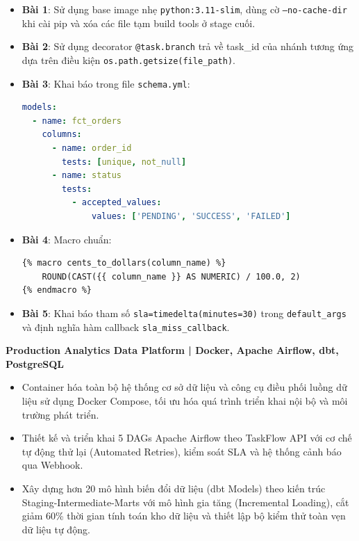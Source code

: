 \begin{dapanbox}
\begin{itemize}
    \item \textbf{Bài 1}: Sử dụng base image nhẹ \texttt{python:3.11-slim}, dùng cờ \texttt{--no-cache-dir} khi cài pip và xóa các file tạm build tools ở stage cuối.
    \item \textbf{Bài 2}: Sử dụng decorator \texttt{@task.branch} trả về task\_id của nhánh tương ứng dựa trên điều kiện \texttt{os.path.getsize(file\_path)}.
    \item \textbf{Bài 3}: Khai báo trong file \texttt{schema.yml}:
    \begin{lstlisting}[language=yaml]
models:
  - name: fct_orders
    columns:
      - name: order_id
        tests: [unique, not_null]
      - name: status
        tests:
          - accepted_values:
              values: ['PENDING', 'SUCCESS', 'FAILED']
    \end{lstlisting}
    \item \textbf{Bài 4}: Macro chuẩn:
    \begin{lstlisting}
{% macro cents_to_dollars(column_name) %}
    ROUND(CAST({{ column_name }} AS NUMERIC) / 100.0, 2)
{% endmacro %}
    \end{lstlisting}
    \item \textbf{Bài 5}: Khai báo tham số \texttt{sla=timedelta(minutes=30)} trong \texttt{default\_args} và định nghĩa hàm callback \texttt{sla\_miss\_callback}.
\end{itemize}
\end{dapanbox}

\begin{cvtipbox}
\textbf{Production Analytics Data Platform | Docker, Apache Airflow, dbt, PostgreSQL}
\begin{itemize}
    \item Container hóa toàn bộ hệ thống cơ sở dữ liệu và công cụ điều phối luồng dữ liệu sử dụng Docker Compose, tối ưu hóa quá trình triển khai nội bộ và môi trường phát triển.
    \item Thiết kế và triển khai 5 DAGs Apache Airflow theo TaskFlow API với cơ chế tự động thử lại (Automated Retries), kiểm soát SLA và hệ thống cảnh báo qua Webhook.
    \item Xây dựng hơn 20 mô hình biến đổi dữ liệu (dbt Models) theo kiến trúc Staging-Intermediate-Marts với mô hình gia tăng (Incremental Loading), cắt giảm 60\% thời gian tính toán kho dữ liệu và thiết lập bộ kiểm thử toàn vẹn dữ liệu tự động.
\end{itemize}
\end{cvtipbox}
